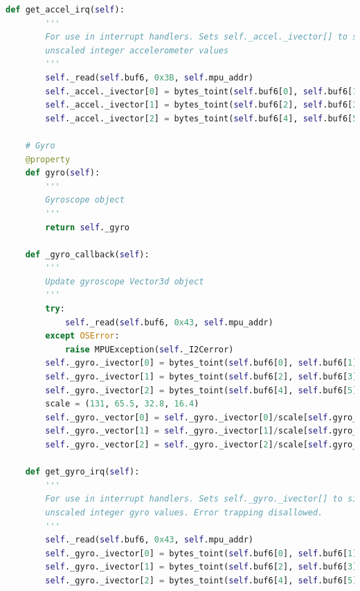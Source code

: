 \documentclass[conference]{IEEEtran}
\begin{document}
\begin{lstlisting}[language=Python, caption=IMU Code, label=imu_code]
    def get_accel_irq(self):
        '''
        For use in interrupt handlers. Sets self._accel._ivector[] to signed
        unscaled integer accelerometer values
        '''
        self._read(self.buf6, 0x3B, self.mpu_addr)
        self._accel._ivector[0] = bytes_toint(self.buf6[0], self.buf6[1])
        self._accel._ivector[1] = bytes_toint(self.buf6[2], self.buf6[3])
        self._accel._ivector[2] = bytes_toint(self.buf6[4], self.buf6[5])

    # Gyro
    @property
    def gyro(self):
        '''
        Gyroscope object
        '''
        return self._gyro

    def _gyro_callback(self):
        '''
        Update gyroscope Vector3d object
        '''
        try:
            self._read(self.buf6, 0x43, self.mpu_addr)
        except OSError:
            raise MPUException(self._I2Cerror)
        self._gyro._ivector[0] = bytes_toint(self.buf6[0], self.buf6[1])
        self._gyro._ivector[1] = bytes_toint(self.buf6[2], self.buf6[3])
        self._gyro._ivector[2] = bytes_toint(self.buf6[4], self.buf6[5])
        scale = (131, 65.5, 32.8, 16.4)
        self._gyro._vector[0] = self._gyro._ivector[0]/scale[self.gyro_range]
        self._gyro._vector[1] = self._gyro._ivector[1]/scale[self.gyro_range]
        self._gyro._vector[2] = self._gyro._ivector[2]/scale[self.gyro_range]

    def get_gyro_irq(self):
        '''
        For use in interrupt handlers. Sets self._gyro._ivector[] to signed
        unscaled integer gyro values. Error trapping disallowed.
        '''
        self._read(self.buf6, 0x43, self.mpu_addr)
        self._gyro._ivector[0] = bytes_toint(self.buf6[0], self.buf6[1])
        self._gyro._ivector[1] = bytes_toint(self.buf6[2], self.buf6[3])
        self._gyro._ivector[2] = bytes_toint(self.buf6[4], self.buf6[5])
    \end{lstlisting}
\end{document}
